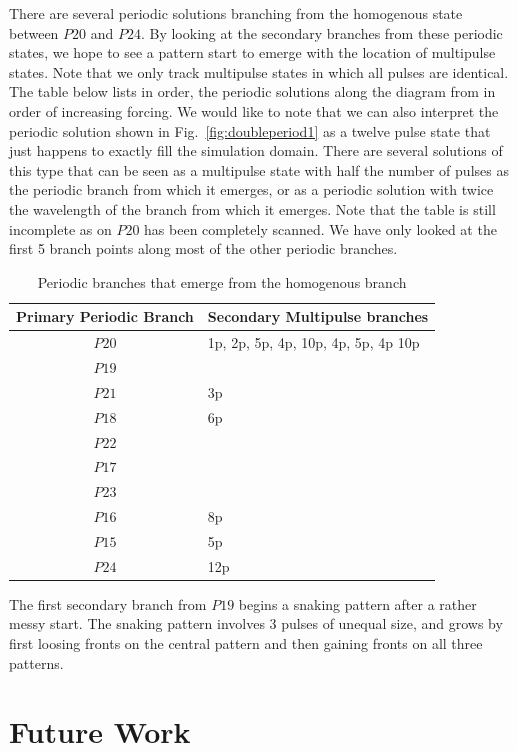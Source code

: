 \documentclass[api,pof,pre,12pt,a4paper]{revtex4-1}
\begin{document}
There are several periodic solutions branching from the homogenous state between $P20$ and $P24$.  By looking at the secondary branches from these periodic states, we hope to see a pattern start to emerge with the location of multipulse states.  Note that we only track multipulse states in which all pulses are identical.  The table below lists in order, the periodic solutions along the diagram from in order of increasing forcing.  We would like to note that we can also interpret the periodic solution shown in Fig.~\ref{fig:doubleperiod1} as a twelve pulse state that just happens to exactly fill the simulation domain.  There are several solutions of this type that can be seen as a multipulse state with half the number of pulses as the periodic branch from which it emerges, or as a periodic solution with twice the wavelength of the branch from which it emerges.  Note that the table is still incomplete as on $P20$ has been completely scanned.  We have only looked at the first 5 branch points along most of the other periodic branches.


\begin{table}[ht]
\caption{Periodic branches that emerge from the homogenous branch} %
\centering %
\begin{tabular}{c l} %
\hline\hline %
Primary Periodic Branch  & Secondary Multipulse branches   \\ [0.5ex] %
\hline %
$P20$ & 1p, 2p, 5p, 4p, 10p, 4p, 5p, 4p 10p\\
$P19$ & \\
$P21$ & 3p\\
$P18$ & 6p\\
 $P22$ & \\
$P17$ & \\
$P23$ & \\
$P16$ & 8p\\
$P15$ & 5p\\
$P24$ &  12p\\ [1ex] %
\hline %
\end{tabular}
\label{table:multipulse} %
\end{table} 

The first secondary branch from $P19$ begins a snaking pattern after a rather messy start.  The snaking pattern involves 3 pulses of unequal size, and grows by first loosing fronts on the central pattern and then gaining fronts on all three patterns.

\section{Future Work}



\end{document}
